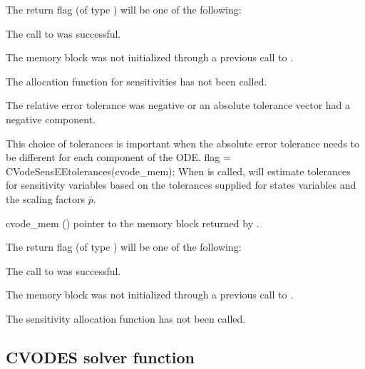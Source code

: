 {
  The return flag  (of type ) will be one of the following:
  \begin{args}
  \item[\Id{CV\_SUCCESS}]
    The call to  was successful.
  \item[\Id{CV\_MEM\_NULL}] 
    The {\cvodes} memory block was not initialized through a previous call to
    .
  \item[\Id{CV\_NO\_SENS}] 
    The allocation function for sensitivities has not been called.
  \item[\Id{CV\_ILL\_INPUT}] 
    The relative error tolerance was negative or an absolute tolerance vector
    had a negative component.
  \end{args}
}
{
  This choice of tolerances is important when the absolute error tolerance needs to
  be different for each component of the ODE. 
}
{
  flag = CVodeSensEEtolerances(cvode\_mem);
}
{
  When  is called, {\cvodes} will estimate tolerances for
  sensitivity variables based on the tolerances supplied for states variables
  and the scaling factors $\bar p$.
}
{
  \begin{args}
  \item[cvode\_mem] ()
    pointer to the {\cvodes} memory block returned by .
  \end{args}
}
{
  The return flag  (of type ) will be one of the following:
  \begin{args}
  \item[\Id{CV\_SUCCESS}]
    The call to  was successful.
  \item[\Id{CV\_MEM\_NULL}] 
    The {\cvodes} memory block was not initialized through a previous call to
    .
  \item[\Id{CV\_NO\_SENS}] 
    The sensitivity allocation function has not been called.
  \end{args}
}
{}
\subsection{CVODES solver function}

